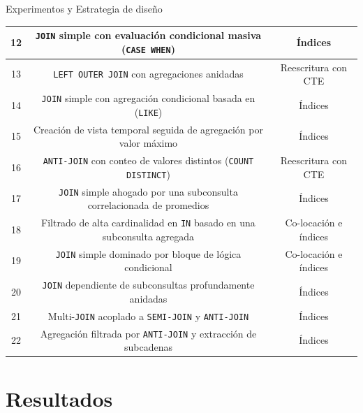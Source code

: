 \documentclass[10pt]{beamer}
\begin{document}
\begin{frame}{Experimentos y Estrategia de diseño}
\begin{table}
\begin{tabular}{c c c}
          12                & \texttt{JOIN} simple con evaluación condicional masiva (\texttt{CASE WHEN})     & Índices                                \\ \hline
          13                & \texttt{LEFT OUTER JOIN} con agregaciones anidadas                              & Reescritura con CTE                    \\ \hline
          14                & \texttt{JOIN} simple con agregación condicional basada en  (\texttt{LIKE})      & Índices                                \\ \hline
          15                & Creación de vista temporal seguida de agregación por valor máximo               & Índices                                \\ \hline
          16                & \texttt{ANTI-JOIN} con conteo de valores distintos (\texttt{COUNT DISTINCT})    & Reescritura con CTE                    \\ \hline
          17                & \texttt{JOIN} simple ahogado por una subconsulta correlacionada de promedios    & Índices                                \\ \hline
          18                & Filtrado de alta cardinalidad en \texttt{IN} basado en una subconsulta agregada & Co-locación e índices                  \\ \hline
          19                & \texttt{JOIN} simple dominado por bloque de lógica condicional                  & Co-locación e índices                  \\ \hline
          20                & \texttt{JOIN} dependiente de subconsultas profundamente anidadas                & Índices                                \\ \hline
          21                & Multi-\texttt{JOIN} acoplado a \texttt{SEMI-JOIN} y \texttt{ANTI-JOIN}          & Índices                                \\ \hline
          22                & Agregación filtrada por \texttt{ANTI-JOIN} y extracción de subcadenas           & Índices                                \\ \hline
        \end{tabular}
      \end{table}
    \end{frame}

  \section{Resultados} %
  \label{sec:resultados}
\end{document}
